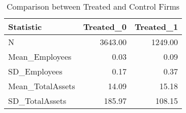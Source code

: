 \begin{table}[ht]
\centering
\begin{tabular}{lrr}
  \hline
Statistic & Treated\_0 & Treated\_1 \\ 
  \hline
N & 3643.00 & 1249.00 \\ 
  Mean\_Employees & 0.03 & 0.09 \\ 
  SD\_Employees & 0.17 & 0.37 \\ 
  Mean\_TotalAssets & 14.09 & 15.18 \\ 
  SD\_TotalAssets & 185.97 & 108.15 \\ 
   \hline
\end{tabular}
\caption{Comparison between Treated and Control Firms} 
\end{table}

